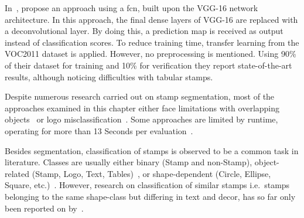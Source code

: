 \begin{description}
\begin{enumerate*}[label={\alph*)},font={\color{red!50!black}\bfseries}]
        In~\cite{Younas.2017110920171115}, \citeauthor*{Younas.2017110920171115}
        propose an approach using a \gls{fcn}, built upon the VGG-16 network
        architecture. In this approach, the final \glspl{dense layer} of VGG-16
        are replaced with a \gls{deconvolutional layer}. By doing this, a
        prediction map is received as output instead of classification scores.
        To reduce training time, transfer learning from the VOC2011 dataset is
        applied. However, no preprocessing is mentioned. Using 90\% of their
        dataset for training and 10\% for verification they report 
        state-of-the-art results, although noticing difficulties with tabular
        stamps.
    \end{enumerate*}
\end{description}

Despite numerous research carried out on stamp segmentation, most of the 
approaches examined in this chapter either face limitations with overlapping 
objects~\cite{Nandedkar.2015082320150826, Nandedkar.2015121620151219, 
Forczmanski.2016, Ahmed.2013082520130828, Dey.2015121620151219, 
Forczmanski.2015, Forczmanski.2016} or logo misclassification~\cite
{Ahmed.2013082520130828, Dey.2015121620151219,Micenkova.2011091820110921}. Some
approaches are limited by runtime, operating for more than 13 Seconds per
evaluation~\cite{Ahmed.2016,Nandedkar.2015082320150826}.
\par
Besides segmentation, classification of stamps is observed to be a common task 
in literature. Classes are usually either binary (Stamp and non-Stamp), 
object-related (Stamp, Logo, Text, Tables)~\cite{Forczmanski.2016,
Nandedkar.2015082320150826, Nandedkar.2015121620151219, Dey.2015121620151219},
or shape-dependent (Circle, Ellipse, Square, etc.)~\cite{Forczmanski.2015}.
However, research on classification of similar stamps i.e.\ stamps belonging to
the same shape-class but differing in text and decor, has so far only been
reported on by~\cite{Petej.2013070720130710}.